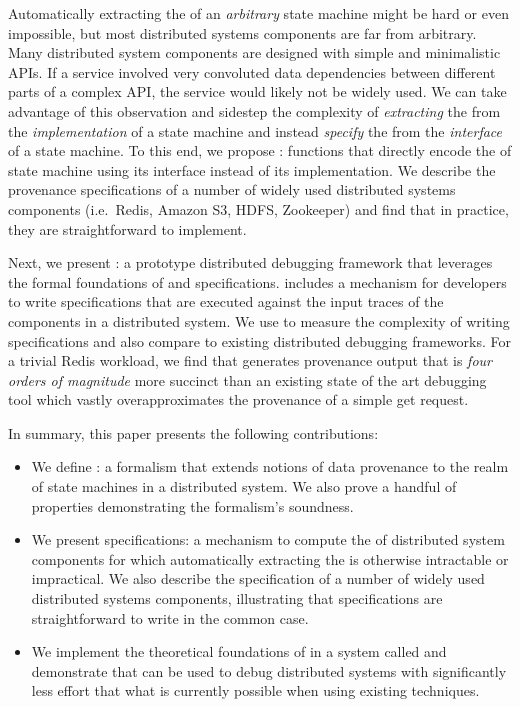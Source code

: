 Automatically extracting the \watprovenance{} of an \emph{arbitrary} state
machine might be hard or even impossible, but most distributed systems
components are far from arbitrary. Many distributed system components are
designed with simple and minimalistic APIs.  If a service involved very
convoluted data dependencies between different parts of a complex API, the
service would likely not be widely used. We can take advantage of this
observation and sidestep the complexity of \emph{extracting} the
\watprovenance{} from the \emph{implementation} of a state machine and instead
\emph{specify} the \watprovenance{} from the \emph{interface} of a state
machine. To this end, we propose :
functions that directly encode the \watprovenance{} of state machine using its
interface instead of its implementation.  We describe the provenance
specifications of a number of widely used distributed systems components (i.e.\
Redis, Amazon S3, HDFS, Zookeeper) and find that in practice, they are
straightforward to implement.

Next, we present \fluent{}: a prototype distributed debugging framework that
leverages the formal foundations of \watprovenance{} and \watprovenance{}
specifications. \fluent{} includes a mechanism for developers to write
\watprovenance{} specifications that are executed against the input traces of
the components in a distributed system. We use \fluent{} to measure the
complexity of writing \watprovenance{} specifications and also compare
\fluent{} to existing distributed debugging frameworks. For a trivial Redis
workload, we find that \fluent{} generates provenance output that is \emph{four
orders of magnitude} more succinct than an existing state of the art debugging
tool which vastly overapproximates the provenance of a simple get request.

In summary, this paper presents the following contributions:
\begin{itemize}
  \item
    We define \watprovenance{}: a formalism that extends notions of data
    provenance to the realm of state machines in a distributed system. We also
    prove a handful \jmh{a pair?} of properties demonstrating the formalism's soundness.
  \item
    We present \watprovenance{} specifications: a mechanism to compute the
    \watprovenance{} of distributed system components for which automatically
    extracting the \watprovenance{} is otherwise intractable or impractical. We
    also describe the \watprovenance{} specification of a number of widely used
    distributed systems components, illustrating that \watprovenance{}
    specifications are straightforward to write in the common case.
  \item
    We implement the theoretical foundations of \watprovenance{} in a system
    called \fluent{} and demonstrate that \fluent{} can be used to debug
    distributed systems with significantly less effort that what is currently
    possible when using existing techniques.
\end{itemize}
